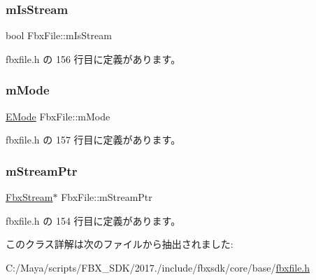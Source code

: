 \subsubsection{\texorpdfstring{m\+Is\+Stream}{mIsStream}}
{\footnotesize\ttfamily bool Fbx\+File\+::m\+Is\+Stream\hspace{0.3cm}{\ttfamily [protected]}}



 fbxfile.\+h の 156 行目に定義があります。

\mbox{\label{class_fbx_file_ad9b7111817531ba69e1abddc7cc6d247}} 
\subsubsection{\texorpdfstring{m\+Mode}{mMode}}
{\footnotesize\ttfamily \hyperlink{class_fbx_file_a0370e8fd17b3658f718e1350a6a6f462}{E\+Mode} Fbx\+File\+::m\+Mode\hspace{0.3cm}{\ttfamily [protected]}}



 fbxfile.\+h の 157 行目に定義があります。

\mbox{\label{class_fbx_file_ad2c5d8c4cc9284b848f2283af005325f}} 
\subsubsection{\texorpdfstring{m\+Stream\+Ptr}{mStreamPtr}}
{\footnotesize\ttfamily \hyperlink{class_fbx_stream}{Fbx\+Stream}$\ast$ Fbx\+File\+::m\+Stream\+Ptr\hspace{0.3cm}{\ttfamily [protected]}}



 fbxfile.\+h の 154 行目に定義があります。



このクラス詳解は次のファイルから抽出されました\+:\begin{DoxyCompactItemize}
\item 
C\+:/\+Maya/scripts/\+F\+B\+X\+\_\+\+S\+D\+K/2017./include/fbxsdk/core/base/\hyperlink{fbxfile_8h}{fbxfile.\+h}\end{DoxyCompactItemize}
